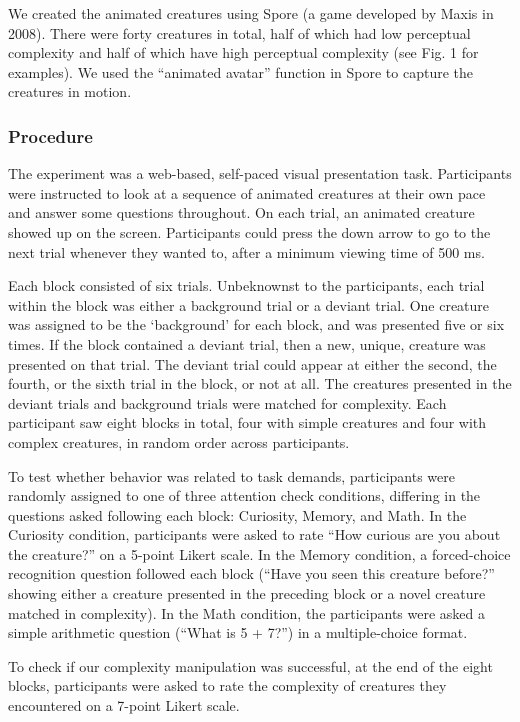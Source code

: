 \documentclass[10pt, letterpaper]{article}
\begin{document}
We created the animated creatures using Spore (a game developed by Maxis
in 2008). There were forty creatures in total, half of which had low
perceptual complexity and half of which have high perceptual complexity
(see Fig. 1 for examples). We used the ``animated avatar'' function in
Spore to capture the creatures in motion.

\hypertarget{procedure}{%
\subsubsection{Procedure}\label{procedure}}

The experiment was a web-based, self-paced visual presentation task.
Participants were instructed to look at a sequence of animated creatures
at their own pace and answer some questions throughout. On each trial,
an animated creature showed up on the screen. Participants could press
the down arrow to go to the next trial whenever they wanted to, after a
minimum viewing time of 500 ms.

Each block consisted of six trials. Unbeknownst to the participants,
each trial within the block was either a background trial or a deviant
trial. One creature was assigned to be the `background' for each block,
and was presented five or six times. If the block contained a deviant
trial, then a new, unique, creature was presented on that trial. The
deviant trial could appear at either the second, the fourth, or the
sixth trial in the block, or not at all. The creatures presented in the
deviant trials and background trials were matched for complexity. Each
participant saw eight blocks in total, four with simple creatures and
four with complex creatures, in random order across participants.

To test whether behavior was related to task demands, participants were
randomly assigned to one of three attention check conditions, differing
in the questions asked following each block: Curiosity, Memory, and
Math. In the Curiosity condition, participants were asked to rate ``How
curious are you about the creature?'' on a 5-point Likert scale. In the
Memory condition, a forced-choice recognition question followed each
block (``Have you seen this creature before?'' showing either a creature
presented in the preceding block or a novel creature matched in
complexity). In the Math condition, the participants were asked a simple
arithmetic question (``What is 5 + 7?'') in a multiple-choice format.

To check if our complexity manipulation was successful, at the end of
the eight blocks, participants were asked to rate the complexity of
creatures they encountered on a 7-point Likert scale.
\end{document}
